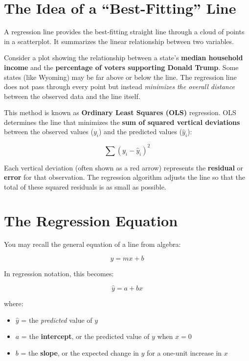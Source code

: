 \documentclass[
  letterpaper,
  DIV=11,
  numbers=noendperiod]{scrreprt}
\providecommand{\tightlist}{%
  \setlength{\itemsep}{0pt}\setlength{\parskip}{0pt}}
\begin{document}
\section{The Idea of a ``Best-Fitting''
Line}\label{the-idea-of-a-best-fitting-line}

A regression line provides the best-fitting straight line through a
cloud of points in a scatterplot. It summarizes the linear relationship
between two variables.

Consider a plot showing the relationship between a state's
\textbf{median household income} and the \textbf{percentage of voters
supporting Donald Trump}. Some states (like Wyoming) may be far above or
below the line. The regression line does not pass through every point
but instead \emph{minimizes the overall distance} between the observed
data and the line itself.

This method is known as \textbf{Ordinary Least Squares (OLS)}
regression. OLS determines the line that minimizes the \textbf{sum of
squared vertical deviations} between the observed values (\(y_i\)) and
the predicted values (\(\hat{y}_i\)):

\[
\sum (y_i - \hat{y}_i)^2
\]

Each vertical deviation (often shown as a red arrow) represents the
\textbf{residual} or \textbf{error} for that observation. The regression
algorithm adjusts the line so that the total of these squared residuals
is as small as possible.

\section{The Regression Equation}\label{the-regression-equation}

You may recall the general equation of a line from algebra:

\[
y = mx + b
\]

In regression notation, this becomes:

\[
\hat{y} = a + bx
\]

where:

\begin{itemize}
\tightlist
\item
  \(\hat{y}\) = the \emph{predicted} value of \(y\)\\
\item
  \(a\) = the \textbf{intercept}, or the predicted value of \(y\) when
  \(x = 0\)\\
\item
  \(b\) = the \textbf{slope}, or the expected change in \(y\) for a
  one-unit increase in \(x\)
\end{itemize}
\end{document}
